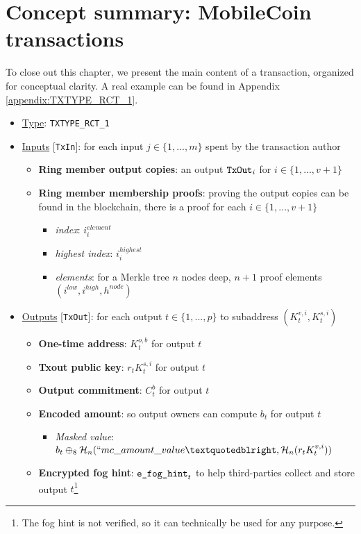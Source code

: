\newpage
\section{Concept summary: MobileCoin transactions}
\label{sec:transaction_summary}

To close out this chapter, we present the main content of a transaction, organized for conceptual clarity. A real example can be found in Appendix \ref{appendix:TXTYPE_RCT_1}.

\begin{itemize}
    \item \underline{Type}: {\tt TXTYPE\_RCT\_1}
    \item \underline{Inputs} [{\tt TxIn}]: for each input $j \in \{1,...,m\}$ spent by the transaction author
    \begin{itemize}
        \item \textbf{Ring member output copies}: an output $\textrm{{\tt TxOut}}_i$ for $i \in \{1,...,v+1\}$
        \item \textbf{Ring member membership proofs}: proving the output copies can be found in the blockchain, there is a proof for each $i \in \{1,...,v+1\}$
        \begin{itemize}
            \item \textit{index}: $i^{element}_i$
            \item \textit{highest index}: $i^{highest}_i$
            \item \textit{elements}: for a Merkle tree $n$ nodes deep, $n+1$ proof elements $(i^{low}, i^{high}, h^{node})$
        \end{itemize}
    \end{itemize}

    \item \underline{Outputs} [{\tt TxOut}]: for each output $t \in \{1,...,p\}$ to subaddress $(K^{v,i}_t,K^{s,i}_t)$
    \begin{itemize}
        \item \textbf{One-time address}: $K^{o,b}_t$ for output $t$
        \item \textbf{Txout public key}: $r_t K^{s,i}_t$ for output $t$
        \item \textbf{Output commitment}: $C^{b}_t$ for output $t$
        \item \textbf{Encoded amount}: so output owners can compute $b_t$ for output $t$
        \begin{itemize}
            \item \textit{Masked value}: $b_t \oplus_8 \mathcal{H}_n(``mc\_amount\_value”, \mathcal{H}_n(r_t K^{v,i}_t))$
        \end{itemize}
        \item \textbf{Encrypted fog hint}: $\textrm{\tt e\_fog\_hint}_t$ to help third-parties collect and store output $t$\footnote{The fog hint is not verified, so it can technically be used for any purpose.}
    \end{itemize}


\end{itemize}
